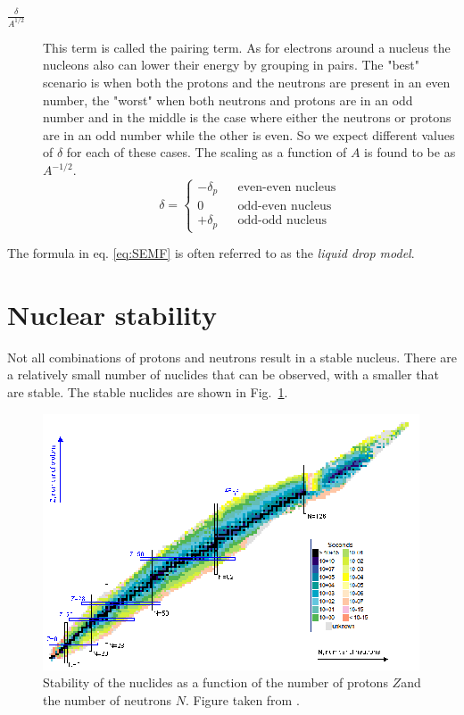 \documentclass[12pt]{article}
\begin{document}
\begin{description}
\item[$\frac{\delta}{A^{1/2}}$] This term is called the pairing term. As for electrons around a nucleus the nucleons also can lower their energy by grouping in pairs. The "best" scenario is when both the protons and the neutrons are present in an even number, the "worst" when both neutrons and protons are in an odd number and in the middle is the case where either the neutrons or protons are in an odd number while the other is even. So we expect different values of $\delta$ for each of these cases. The scaling as a function of $A$ is found to be as $A^{-1/2}$.     
\[\delta=\left\{\begin{array}{ccc}
-\delta_p& &\mbox{even-even nucleus}\\
0& &\mbox{odd-even nucleus}\\
+\delta_p& &\mbox{odd-odd nucleus}
\end{array}\right.\]
\end{description}

The formula in eq. \ref{eq:SEMF} is often referred to as the \emph{liquid drop model}. 

\section{Nuclear stability} 
Not all combinations of protons and neutrons result in a stable nucleus. There are a relatively small number of nuclides that can be observed, with a smaller that are stable. The stable nuclides are shown in Fig.~\ref{fig:stability}. 
\begin{figure}
\begin{center}
 \includegraphics[scale=0.7]{images/stability.png}
\end{center}
 \caption{Stability of the nuclides as a function of the number of protons $Z$and the number of neutrons $N$. Figure taken from \cite{nndc}.}\label{fig:stability}
\end{figure}
\end{document}
